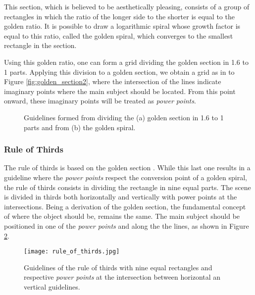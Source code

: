 This section, which is believed to be aesthetically pleasing, consists of a group of rectangles in which the ratio of the longer side to the shorter is equal to the golden ratio. It is possible to draw a logarithmic spiral whose growth factor is equal to this ratio, called the golden spiral, which converges to the smallest rectangle in the section. 

Using this golden ratio, one can form a grid dividing the golden section in 1.6 to 1 parts. Applying this division to a golden section, we obtain a grid as in to Figure \ref{fig:golden_section2}, where the intersection of the lines indicate imaginary points where the main subject should be located. From this point onward, these imaginary points will be treated as \emph{power points}. 

\begin{figure}[htbp]
        \centering
  \caption{Guidelines formed from dividing the (a) golden section in 1.6 to 1 parts and from (b) the golden spiral.}
  \label{fig:golden_section_image}
\end{figure}

\subsubsection{Rule of Thirds}
\label{subsub:rule_thirds}

The rule of thirds is based on the golden section \cite{Santos}. While this last one results in a guideline where the \emph{power points} respect the conversion point of a golden spiral, the rule of thirds consists in dividing the rectangle in nine equal parts. The scene is divided in thirds both horizontally and vertically with power points at the intersections.
Being a derivation of the golden section, the fundamental concept of where the object should be, remains the same. The main subject should be positioned in one of the \emph{power points} and along the the lines, as shown in Figure \ref{fig:rule_of_thirds_image}.

\begin{figure}[htbp]
    \centering
	\label{fig:rule_of_thirds_example}
    \texttt{[image: rule\_of\_thirds.jpg]}
	\caption{Guidelines of the rule of thirds with nine equal rectangles and respective \emph{power points} at the intersection between horizontal an vertical guidelines.}
	\label{fig:rule_of_thirds_image}
\end{figure}

